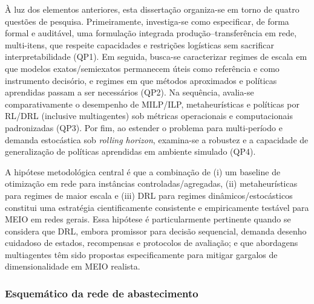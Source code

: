 À luz dos elementos anteriores, esta dissertação organiza-se em torno de quatro questões de pesquisa. Primeiramente, investiga-se como especificar, de forma formal e auditável, uma formulação integrada produção--transferência em rede, multi-itens, que respeite capacidades e restrições logísticas sem sacrificar interpretabilidade (QP1). Em seguida, busca-se caracterizar regimes de escala em que modelos exatos/semiexatos permanecem úteis como referência e como instrumento decisório, e regimes em que métodos aproximados e políticas aprendidas passam a ser necessários (QP2). Na sequência, avalia-se comparativamente o desempenho de MILP/ILP, metaheurísticas e políticas por RL/DRL (inclusive multiagentes) sob métricas operacionais e computacionais padronizadas (QP3). Por fim, ao estender o problema para multi-período e demanda estocástica sob \emph{rolling horizon}, examina-se a robustez e a capacidade de generalização de políticas aprendidas em ambiente simulado (QP4). \cite{BirgeLouveaux2011StochasticProgramming,Law2015SimulationModeling,Boute2022DRLInventoryRoadmap,Geevers2024MEIODRL,Ziegner2025IMARL}

A hipótese metodológica central é que a combinação de (i) um baseline de otimização em rede para instâncias controladas/agregadas, (ii) metaheurísticas para regimes de maior escala e (iii) DRL para regimes dinâmicos/estocásticos constitui uma estratégia cientificamente consistente e empiricamente testável para MEIO em redes gerais. \cite{Shapiro2001ModelingSupplyChain,AhujaMagnantiOrlin1993NetworkFlows,Talbi2009Metaheuristics,Boute2022DRLInventoryRoadmap} Essa hipótese é particularmente pertinente quando se considera que DRL, embora promissor para decisão sequencial, demanda desenho cuidadoso de estados, recompensas e protocolos de avaliação; e que abordagens multiagentes têm sido propostas especificamente para mitigar gargalos de dimensionalidade em MEIO realista. \cite{Geevers2024MEIODRL,Ziegner2025IMARL,Schulman2017PPO,Oroojlooyjadid2022BeerGameDQN}

\subsubsection*{Esquemático da rede de abastecimento}

